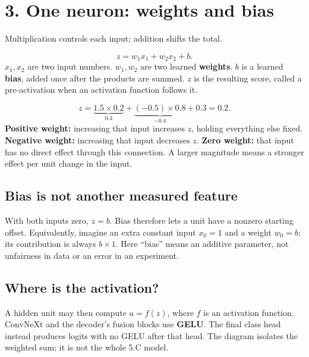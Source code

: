 \documentclass[11pt,letterpaper]{article}
\newcommand{\guidepage}[2]{\clearpage\pdfbookmark[0]{#1}{guide-\thepage}\section*{#1}{\sffamily\color{muted}#2}\par\vspace{5pt}}
\begin{document}
\guidepage{3. One neuron: weights and bias}{Multiplication controls each input; addition shifts the total.}
\[
z=w_1x_1+w_2x_2+b.
\]
$x_1,x_2$ are two input numbers. $w_1,w_2$ are two learned \textbf{weights}. $b$ is a learned \textbf{bias}, added once after the products are summed. $z$ is the resulting score, called a pre-activation when an activation function follows it.

\begin{center}
\end{center}
\[
z=\underbrace{1.5\times0.2}_{0.3}
+\underbrace{(-0.5)\times0.8}_{-0.4}+0.3=0.2.
\]
\textbf{Positive weight:} increasing that input increases $z$, holding everything else fixed. \textbf{Negative weight:} increasing that input decreases $z$. \textbf{Zero weight:} that input has no direct effect through this connection. A larger magnitude means a stronger effect per unit change in the input.

\subsection*{Bias is not another measured feature}
With both inputs zero, $z=b$. Bias therefore lets a unit have a nonzero starting offset. Equivalently, imagine an extra constant input $x_0=1$ and a weight $w_0=b$: its contribution is always $b\times1$. Here ``bias'' means an additive parameter, not unfairness in data or an error in an experiment.

\subsection*{Where is the activation?}
A hidden unit may then compute $a=f(z)$, where $f$ is an activation function. ConvNeXt and the decoder's fusion blocks use \textbf{GELU}. The final class head instead produces logits with no GELU after that head. The diagram isolates the weighted sum; it is not the whole 5.C model.
\end{document}
